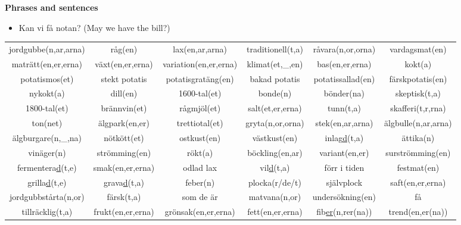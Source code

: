 
\begin{flushleft}
    \textbf{Phrases and sentences}
    \begin{itemize}
        \item Kan vi få notan? (May we have the bill?)
    \end{itemize}
\end{flushleft}

\begin{center}
    \begin{adjustwidth}{-2.5cm}{}
        \begin{tabular}{|c c c c c c|}
            \hline
            jordgubbe(n,ar,arna) & råg(en) & lax(en,ar,arna) & traditionell(t,a) & råvara(n,or,orna) & vardagsmat(en) \\
            maträtt(en,er,erna) & växt(en,er,erna) & variation(en,er,erna) & klimat(et,\_,en) & bas(en,er,erna) & kokt(a) \\
            potatismos(et) & stekt potatis & potatisgratäng(en) & bakad potatis & potatissallad(en) & färskpotatis(en) \\
            nykokt(a) & dill(en) & 1600-tal(et) & bonde(n) & bönder(na) & skeptisk(t,a) \\
            1800-tal(et) & brännvin(et) & rågmjöl(et) & salt(et,er,erna) & tunn(t,a) & skafferi(t,r,rna) \\
            ton(net) & älgpark(en,er) & trettiotal(et) & gryta(n,or,orna) & stek(en,ar,arna) & älgbulle(n,ar,arna) \\
            älgburgare(n,\_,na) & nötkött(et) & ostkust(en) & västkust(en) & inlag\underline{d}(t,a) & ättika(n) \\
            vinäger(n) & strömming(en) & rökt(a) & böckling(en,ar) & variant(en,er) & surströmming(en) \\
            fermentera\underline{d}(t,e) & smak(en,er,erna) & odlad lax & vil\underline{d}(t,a) & förr i tiden & festmat(en) \\
            grilla\underline{d}(t,e) & grava\underline{d}(t,a) & feber(n) & plocka(r/de/t) & självplock & saft(en,er,erna) \\
            jordgubbstårta(n,or) & färsk(t,a) & som de är & matvana(n,or) & undersökning(en) & få \\
            tillräcklig(t,a) & frukt(en,er,erna) & grönsak(en,er,erna) & fett(en,er,erna) & fib\underline{er}(n,rer(na)) & trend(en,er(na)) \\

\end{tabular}
\end{adjustwidth}
\end{center}
